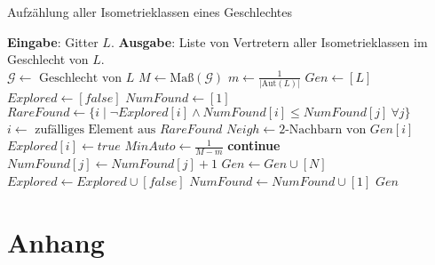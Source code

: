\documentclass[12pt,a4paper,halfparskip,headsepline,bibtotocnumbered]{scrreprt}
\theoremstyle{nummermitklammern}
\theoremstyle{nonumberbreak}
\begin{document}
\begin{algorithm}[H]
	\caption{Aufzählung aller Isometrieklassen eines Geschlechtes}\label{alg:knesneigh}
	\begin{algorithmic}[1]
		\State \textbf{Eingabe}: Gitter $L$.
		\State \textbf{Ausgabe}: Liste von Vertretern aller Isometrieklassen im Geschlecht von $L$.
		\\
		\State $\mathcal{G} \gets \text{ Geschlecht von } L$
		\State $M \gets \text{Maß}(\mathcal{G})$
		\State $m \gets \frac{1}{\vert \text{Aut} (L) \vert}$
		\State $Gen \gets \left[ L\right]$
		\State $Explored \gets \left[ false \right]$
		\State $NumFound \gets \left[ 1 \right]$
			\State $RareFound \gets \lbrace i \mid \neg Explored[i] \wedge NumFound[i] \leq NumFound[j]\  \forall j\rbrace$
			\State $i \gets \text{ zufälliges Element aus } RareFound$
			\State $Neigh \gets 2\text{-Nachbarn von } Gen[i]$
			\State $Explored[i] \gets true$
				\State $MinAuto \gets \frac{1}{M-m}$
					\State \textbf{continue}
				\EndIf
					\State $NumFound[j] \gets NumFound[j] + 1$
				\Else
					\State $Gen \gets Gen \cup \left[ N \right]$
					\State $Explored \gets Explored \cup \left[ false \right]$
					\State $NumFound \gets NumFound \cup \left[ 1 \right]$
				\EndIf
			\EndFor
		\EndWhile
		\State \Return $Gen$
	\end{algorithmic}
\end{algorithm}


\chapter{Anhang}
\end{document}
